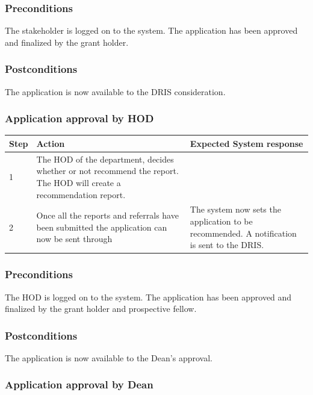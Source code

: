 \documentclass[12pt]{article}
\begin{document}
\subsubsection*{Preconditions}
The stakeholder is logged on to the system. The application has been approved and finalized by the grant holder.

\subsubsection*{Postconditions}
The application is now available to the DRIS consideration.

\subsubsection{Application approval by HOD}

\begin{center}
\begin{tabular}{|l|p{6cm}|p{8cm}|}
\hline
Step & Action & Expected System response \\
\hline
1 & The HOD of the department, decides whether or not recommend the report. The HOD will create a recommendation report. \\
\hline
2 & Once all the reports and referrals have been submitted the application can now be sent through  & The system now sets the application to be recommended. A notification is sent to the DRIS. \\
\hline
\end{tabular}
\end{center}

\subsubsection*{Preconditions}
The HOD is logged on to the system. The application has been approved and finalized by the grant holder and prospective fellow.

\subsubsection*{Postconditions}
The application is now available to the Dean's approval.

\subsubsection{Application approval by Dean}
\end{document}
